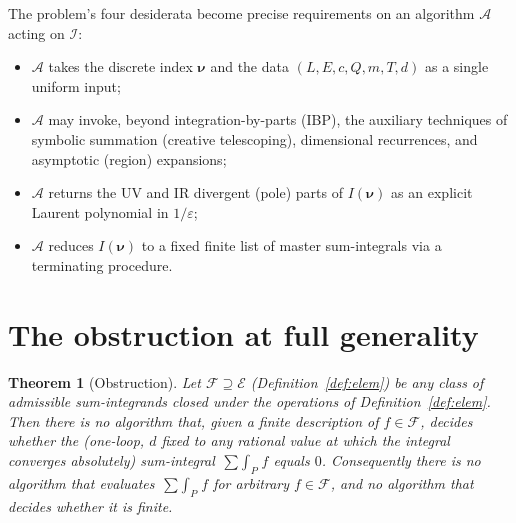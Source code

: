 \documentclass{amsart}
\newtheorem{theorem}{Theorem}
\theoremstyle{definition}
\begin{document}
The problem's four desiderata become precise requirements on an algorithm
$\mathcal A$ acting on $\mathcal I$:
\begin{itemize}
\item[(R1)] $\mathcal A$ takes the discrete index $\boldsymbol\nu$ and the
data $(L,E,c,Q,m,T,d)$ as a single uniform input;
\item[(R2)] $\mathcal A$ may invoke, beyond integration-by-parts (IBP),
the auxiliary techniques of symbolic summation (creative telescoping),
dimensional recurrences, and asymptotic (region) expansions;
\item[(R3)] $\mathcal A$ returns the UV and IR divergent (pole) parts of
$I(\boldsymbol\nu)$ as an explicit Laurent polynomial in $1/\varepsilon$;
\item[(R4)] $\mathcal A$ reduces $I(\boldsymbol\nu)$ to a fixed finite list of
master sum-integrals via a terminating procedure.
\end{itemize}

\section{The obstruction at full generality}

\begin{theorem}[Obstruction]\label{thm:obstruction}
Let $\mathcal F\supseteq\mathcal E$ (Definition~\ref{def:elem}) be any class of
admissible sum-integrands closed under the operations of
Definition~\ref{def:elem}. Then there is \emph{no} algorithm that, given a
finite description of $f\in\mathcal F$, decides whether the (one-loop, $d$
fixed to any rational value at which the integral converges absolutely)
sum-integral $\mathop{\sum\!\!\int}_P f$ equals $0$. Consequently there is no
algorithm that evaluates $\mathop{\sum\!\!\int}_P f$ for arbitrary
$f\in\mathcal F$, and no algorithm that decides whether it is finite.
\end{theorem}
\end{document}
